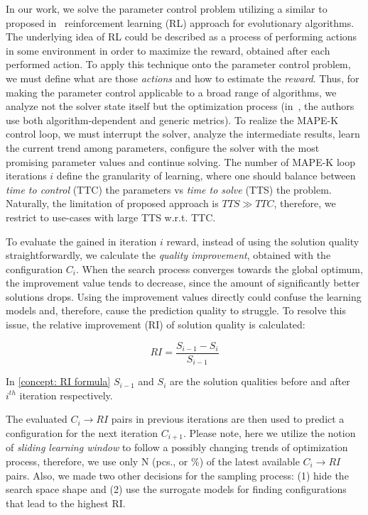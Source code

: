 In our work, we solve the parameter control problem utilizing a similar to proposed in~\cite{karafotias2014generic} reinforcement learning (RL) approach for evolutionary algorithms.
The underlying idea of RL could be described as a process of performing actions in some environment in order to maximize the reward, obtained after each performed action. To apply this technique onto the parameter control problem, we must define what are those \emph{actions} and how to estimate the \emph{reward}. Thus, for making the parameter control applicable to a broad range of algorithms, we analyze not the solver state itself but the optimization process (in~\cite{karafotias2014generic}, the authors use both algorithm-dependent and generic metrics). To realize the MAPE-K control loop, we must interrupt the solver, analyze the intermediate results, learn the current trend among parameters, configure the solver with the most promising parameter values and continue solving. The number of MAPE-K loop iterations $i$ define the granularity of learning, where one should balance between \emph{time to control} (TTC) the parameters vs \emph{time to solve} (TTS) the problem. Naturally, the limitation of proposed approach is $TTS \gg TTC$, therefore, we restrict to use-cases with large TTS w.r.t. TTC.

To evaluate the gained in iteration $i$ reward, instead of using the solution quality straightforwardly, we calculate the \emph{quality improvement}, obtained with the configuration $C_i$. When the search process converges towards the global optimum, the improvement value tends to decrease, since the amount of significantly better solutions drops. Using the improvement values directly could confuse the learning models and, therefore, cause the prediction quality to struggle. To resolve this issue, the relative improvement (RI) of solution quality is calculated: 

\begin{equation}
RI = \frac{S_{i-1} - S_{i}}{S_{i-1}}
\label{concept: RI formula}
\end{equation}

In \cref{concept: RI formula} $S_{i-1}$ and $S_i$ are the solution qualities before and after $i^{th}$ iteration respectively.

The evaluated $C_i \rightarrow RI$ pairs in previous iterations are then used to predict a configuration for the next iteration $C_{i+1}$. Please note, here we utilize the notion of \emph{sliding learning window} to follow a possibly changing trends of optimization process, therefore, we use only N (pcs., or \%) of the latest available $C_i \rightarrow RI$ pairs. Also, we made two other decisions for the sampling process: (1) hide the search space shape and (2) use the surrogate models for finding configurations that lead to the highest RI.

